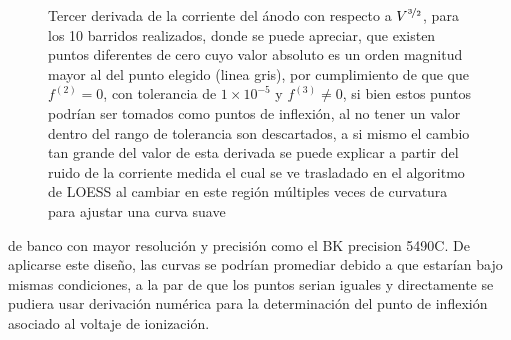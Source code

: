 \begin{figure}[H]
	\caption{Tercer derivada de la corriente del ánodo con respecto a $V^{\nicefrac{3}{2}}$, para los 10 barridos realizados, donde se puede apreciar, que existen puntos diferentes de cero cuyo valor absoluto es un orden magnitud mayor al del punto elegido (linea gris), por cumplimiento de que que $f^{(2)} = 0$, con tolerancia de $1\times10^{-5}$ y $f^{(3)} \neq 0$, si bien estos puntos podrían ser tomados como puntos de inflexión, al no tener un valor dentro del rango de tolerancia son descartados, a si mismo el cambio tan grande del valor de esta derivada se puede explicar a partir del ruido de la corriente medida el cual se ve trasladado en el algoritmo de LOESS al cambiar en este región múltiples veces de curvatura para ajustar una curva suave }
	\label{fig:potdersts}
\end{figure}

\twocolumngrid


de banco con mayor resolución y precisión como el BK precision 5490C. De aplicarse este diseño, las curvas se podrían promediar debido a que estarían bajo mismas condiciones, a la par de que los puntos serian iguales y directamente se pudiera usar derivación numérica para la determinación del punto de inflexión asociado al voltaje de ionización.
